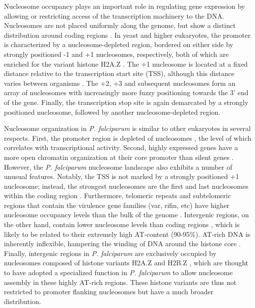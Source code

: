 Nucleosome occupancy plays an important role in regulating gene expression by
allowing or restricting access of the transcription machinery to the DNA.
Nucleosomes are not placed uniformly along the genome, but show a distinct
distribution around coding regions \citep{brogaard:map,
buenrostro:quantitative, jansen:nucleosome, lee:high-resolution,
mavrich:nucleosome}. In yeast and higher eukaryotes,
the promoter is characterized by a nucleosome-depleted region, bordered on
either side by strongly positioned -1 and +1 nucleosomes, respectively, both
of which are enriched for the variant histone H2A.Z
\citep{raisner:histone, guillemette:variant, tolstorukov:comparative}. The +1 nucleosome
is located at a fixed distance relative to the transcription start site (TSS),
although this distance varies between organisms \citep{lee:high-resolution}. The +2, +3 and
subsequent nucleosomes form an array of nucleosomes with increasingly more
fuzzy positioning towards the 3’ end of the gene. Finally, the transcription
stop site is again demarcated by a strongly positioned nucleosome, followed by
another nucleosome-depleted region.

Nucleosome organization in \textit{P. falciparum} is similar to other eukaryotes in
several respects. First, the promoter region is depleted of nucleosomes
\citep{bunnik:DNA-encoded, ponts:nucleosome, westenberger:genome-wide},
the level of which correlates with transcriptional activity. Second,
highly expressed genes have a more open chromatin organization at their core
promoter than silent genes \citep{bunnik:DNA-encoded, ponts:nucleosome}.
However, the \textit{P. falciparum} nucleosome
landscape also exhibits a number of unusual features. Notably, the TSS is not
marked by a strongly positioned +1 nucleosome; instead, the strongest
nucleosomes are the first and last nucleosomes within the coding region
\citep{bunnik:DNA-encoded, ponts:nucleosome}. Furthermore,
telomeric repeats and subtelomeric regions that contain
the virulence gene families (var, rifin, etc) have higher nucleosome occupancy
levels than the bulk of the genome \citep{bunnik:DNA-encoded,
ponts:nucleosome, segal:genomic}. Intergenic regions, on the
other hand, contain lower nucleosome levels than coding regions
\citep{bunnik:DNA-encoded, ponts:nucleosome, segal:genomic, ponts:nucleosome2},
which is likely to be related to their extremely high AT-content (90-95\%).
AT-rich DNA is inherently inflexible, hampering the winding of DNA around the
histone core \citep{tillo:GC, segal:poly}. 
Finally, intergenic regions in \textit{P. falciparum} are
exclusively occupied by nucleosomes composed of histone variants H2A.Z and
H2B.Z \citep{hoeijmakers:h2az, petter:h2az}, 
which are thought to have adopted a specialized function in \textit{P.
falciparum} to allow nucleosome assembly in these highly AT-rich regions. These
histone variants are thus not restricted to promoter flanking nucleosomes but
have a much broader distribution.

